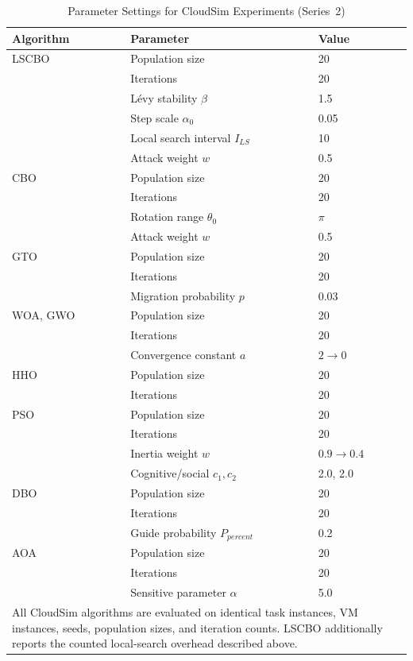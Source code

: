 \documentclass[pdflatex,onecolumn,sn-mathphys-num]{sn-jnl}
\begin{document}
\begin{table}[ht]
\centering
\caption{Parameter Settings for CloudSim Experiments (Series~2)}\label{tab:param_cloudsim}
\begin{tabular}{l l l}
\toprule
\textbf{Algorithm} & \textbf{Parameter} & \textbf{Value} \\
\midrule
LSCBO & Population size & 20 \\
       & Iterations & 20 \\
       & L\'{e}vy stability $\beta$ & 1.5 \\
       & Step scale $\alpha_0$ & 0.05 \\
       & Local search interval $I_{LS}$ & 10 \\
       & Attack weight $w$ & 0.5 \\
\midrule
CBO & Population size & 20 \\
    & Iterations & 20 \\
    & Rotation range $\theta_0$ & $\pi$ \\
    & Attack weight $w$ & 0.5 \\
\midrule
GTO & Population size & 20 \\
    & Iterations & 20 \\
    & Migration probability $p$ & 0.03 \\
\midrule
WOA, GWO & Population size & 20 \\
    & Iterations & 20 \\
    & Convergence constant $a$ & $2 \rightarrow 0$ \\
\midrule
HHO & Population size & 20 \\
    & Iterations & 20 \\
\midrule
PSO & Population size & 20 \\
    & Iterations & 20 \\
    & Inertia weight $w$ & $0.9 \rightarrow 0.4$ \\
    & Cognitive/social $c_1, c_2$ & 2.0, 2.0 \\
\midrule
DBO & Population size & 20 \\
    & Iterations & 20 \\
    & Guide probability $P_{percent}$ & 0.2 \\
\midrule
AOA & Population size & 20 \\
    & Iterations & 20 \\
    & Sensitive parameter $\alpha$ & 5.0 \\
\midrule
\multicolumn{3}{p{0.88\textwidth}}{\footnotesize{All CloudSim algorithms are evaluated on identical task instances, VM instances, seeds, population sizes, and iteration counts. LSCBO additionally reports the counted local-search overhead described above.}} \\
\bottomrule
\end{tabular}
\end{table}
\end{document}
